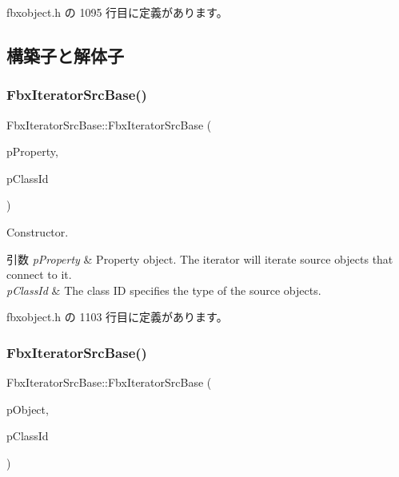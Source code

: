  fbxobject.\+h の 1095 行目に定義があります。



\subsection{構築子と解体子}
\mbox{\label{class_fbx_iterator_src_base_a98ce94a7c69a7e7bac6e01901a0a7500}} 
\subsubsection{\texorpdfstring{Fbx\+Iterator\+Src\+Base()}{FbxIteratorSrcBase()}\hspace{0.1cm}{\footnotesize\ttfamily [1/2]}}
{\footnotesize\ttfamily Fbx\+Iterator\+Src\+Base\+::\+Fbx\+Iterator\+Src\+Base (\begin{DoxyParamCaption}\item[{\hyperlink{class_fbx_property}{Fbx\+Property} \&}]{p\+Property,  }\item[{\hyperlink{class_fbx_class_id}{Fbx\+Class\+Id}}]{p\+Class\+Id }\end{DoxyParamCaption})\hspace{0.3cm}{\ttfamily [inline]}}

Constructor. 
\begin{DoxyParams}{引数}
{\em p\+Property} & Property object. The iterator will iterate source objects that connect to it. \\
\hline
{\em p\+Class\+Id} & The class ID specifies the type of the source objects. \\
\hline
\end{DoxyParams}


 fbxobject.\+h の 1103 行目に定義があります。

\mbox{\label{class_fbx_iterator_src_base_a17e8eab0754f02a28ca18b0e176f1533}} 
\subsubsection{\texorpdfstring{Fbx\+Iterator\+Src\+Base()}{FbxIteratorSrcBase()}\hspace{0.1cm}{\footnotesize\ttfamily [2/2]}}
{\footnotesize\ttfamily Fbx\+Iterator\+Src\+Base\+::\+Fbx\+Iterator\+Src\+Base (\begin{DoxyParamCaption}\item[{\hyperlink{class_fbx_object}{Fbx\+Object} $\ast$}]{p\+Object,  }\item[{\hyperlink{class_fbx_class_id}{Fbx\+Class\+Id}}]{p\+Class\+Id }\end{DoxyParamCaption})\hspace{0.3cm}{\ttfamily [inline]}}

